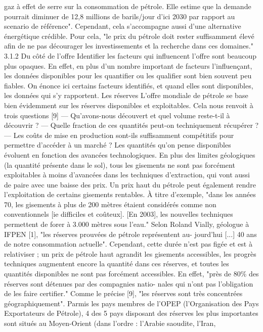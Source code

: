 gaz à effet de serre sur la consommation de pétrole. Elle estime que la demande pourrait diminuer
de 12,8 millions de barils/jour d’ici 2030 par rapport au scenario de référence". Cependant, cela
s’accompagne aussi d’une alternative énergétique crédible. Pour cela, "le prix du pétrole doit rester
suffisamment élevé afin de ne pas décourager les investissements et la recherche dans ces domaines."
3.1.2
Du côté de l’offre
Identifier les facteurs qui influencent l’offre sont beaucoup plus opaques. En effet, en plus
d’un nombre important de facteurs l’influençant, les données disponibles pour les quantifier ou les
qualifier sont bien souvent peu fiables. On énonce ici certains facteurs identifiés, et quand elles sont
disponibles, les données qui s’y rapportent.
Les réserves L’offre mondiale de pétrole se base bien évidemment sur les réserves disponibles
et exploitables. Cela nous renvoit à trois questions [9]
— Qu’avons-nous découvert et quel volume reste-t-il à découvrir ?
— Quelle fraction de ces quantités peut-on techniquement récupérer ?
— Les coûts de mise en production sont-ils suffisamment compétitifs pour permettre d’accéder
à un marché ?
Les quantités qu’on pense disponibles évoluent en fonction des avancées technologiques. En plus
des limites géologiques (la quantité présente dans le sol), tous les gisements ne sont pas forcément
exploitables à moins d’avancées dans les techniques d’extraction, qui vont aussi de paire avec une
baisse des prix. Un prix haut du pétrole peut également rendre l’exploitation de certains gisements
rentables. À titre d’exemple, "dans les années 70, les gisements à plus de 200 mètres étaient
considérés comme non conventionnels [ie difficiles et coûteux]. [En 2003], les nouvelles techniques
permettent de forer à 3.000 mètres sous l’eau."
Selon Roland Vially, géologue à IFPEN [1], "les réserves prouvées de pétrole représentent au-
jourd’hui [...] 40 ans de notre consommation actuelle". Cependant, cette durée n’est pas figée et
est à relativiser ; un prix de pétrole haut agrandit les gisements accessibles, les progrès techniques
augmentent encore la quantité dans ces réserves, et toutes les quantités disponibles ne sont pas
forcément accessibles. En effet, "près de 80\% des réserves sont détenues par des compagnies natio-
nales qui n’ont pas l’obligation de les faire certifier."
Comme le précise [9], "les réserves sont très concentrées géographiquement". Parmis les pays
membres de l’OPEP (l’Organisation des Pays Exportateurs de Pétrole), 4 des 5 pays disposant des
réserves les plus importantes sont situés au Moyen-Orient (dans l’ordre : l’Arabie saoudite, l’Iran,
